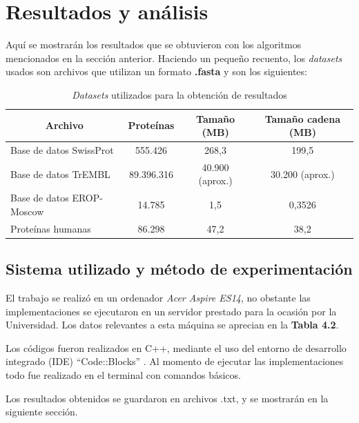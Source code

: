 \chapter{Resultados y análisis}

Aquí se mostrarán los resultados que se obtuvieron con los algoritmos mencionados en la sección anterior. Haciendo un pequeño recuento, los \textit{datasets} usados son archivos que utilizan un formato \textbf{.fasta} y son los siguientes:

\begin{table}[h]
\centering
\begin{tabular}{|l|c|c|c|}
\hline
\multicolumn{1}{|c|}{\textbf{Archivo}} & \textbf{Proteínas} & \textbf{Tamaño (MB)} & \textbf{Tamaño cadena (MB)} \\ \hline
Base de datos SwissProt    & 555.426                & 268,3                & 199,5              \\
Base de datos TrEMBL        & 89.396.316              & 40.900 (aprox.)       & 30.200 (aprox.)     \\
Base de datos EROP-Moscow        & 14.785                 & 1,5                  & 0,3526                \\
Proteínas humanas     & 86.298                 & 47,2                 & 38,2               \\ \hline
\end{tabular}
\caption{\textit{Datasets} utilizados para la obtención de resultados}
\label{tb:labelr1}
\end{table} 

\section{Sistema utilizado y método de experimentación}

El trabajo se realizó en un ordenador \textit{Acer Aspire ES14}, no obstante las implementaciones se ejecutaron en un servidor prestado para la ocasión por la Universidad. Los datos relevantes a esta máquina se aprecian en la \textbf{Tabla 4.2}.

Los códigos fueron realizados en C++, mediante el uso del entorno de desarrollo integrado (IDE) ``Code::Blocks'' \cite{codeblocks}. Al momento de ejecutar las implementaciones todo fue realizado en el terminal con comandos básicos.

Los resultados obtenidos se guardaron en archivos .txt, y se mostrarán en la siguiente sección.

\newpage

